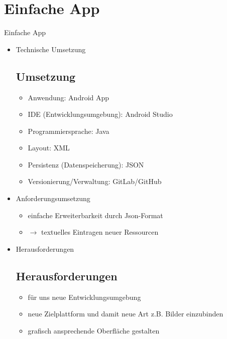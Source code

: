 \documentclass[10pt,fleqn]{beamer}
\begin{document}
\section{Einfache App}
\begin{frame}[t]{Einfache App}
	\begin{itemize}
		\item Technische Umsetzung
		\subsection{Umsetzung}
		\begin{itemize}
			\item Anwendung: Android App
			\item IDE (Entwicklungsumgebung): Android Studio
			\item Programmiersprache: Java
			\item Layout: XML
			\item Persistenz (Datenspeicherung): JSON
			\item Versionierung/Verwaltung: GitLab/GitHub
		\end{itemize}
		\item Anforderungsumsetzung
			\begin{itemize}
			\item einfache Erweiterbarkeit durch Json-Format
			\item[] $\rightarrow$ textuelles Eintragen neuer Ressourcen
			\end{itemize}
		\item Herausforderungen
		\subsection{Herausforderungen}
		\begin{itemize}
			\item für uns neue Entwicklungsumgebung
			\item neue Zielplattform und damit neue Art z.B. Bilder einzubinden
			\item grafisch ansprechende Oberfläche gestalten
		\end{itemize}
	\end{itemize}
\end{frame}
\end{document}
